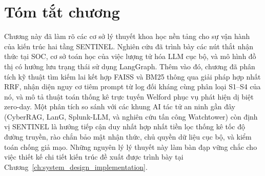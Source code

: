 \section{Tóm tắt chương}

Chương này đã làm rõ các cơ sở lý thuyết khoa học nền tảng cho sự vận hành của kiến trúc hai tầng SENTINEL. Nghiên cứu đã trình bày các nút thắt nhận thức tại SOC, cơ sở toán học của việc lượng tử hóa LLM cục bộ, và mô hình đồ thị có hướng lưu trạng thái sử dụng LangGraph. Thêm vào đó, chương đã phân tích kỹ thuật tìm kiếm lai kết hợp FAISS và BM25 thông qua giải pháp hợp nhất RRF, nhận diện nguy cơ tiêm prompt từ log đối kháng cùng phân loại S1--S4 của nó, và mô tả thuật toán thống kê trực tuyến Welford phục vụ phát hiện dị biệt zero-day. Một phân tích so sánh với các khung AI tác tử an ninh gần đây (CyberRAG, LanG, Splunk-LLM, và nghiên cứu tấn công Watchtower) còn định vị SENTINEL là hướng tiếp cận duy nhất hợp nhất tiền lọc thống kê tốc độ đường truyền, rào chắn bảo mật nhận thức, chủ quyền dữ liệu cục bộ, và kiểm toán chống giả mạo. Những nguyên lý lý thuyết này làm bàn đạp vững chắc cho việc thiết kế chi tiết kiến trúc đề xuất được trình bày tại Chương~\ref{ch:system_design_implementation}.
